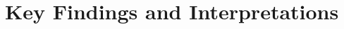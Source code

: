\section{Key Findings and Interpretations} %
  \label{Key Findings and Interpretations} %


\todo






